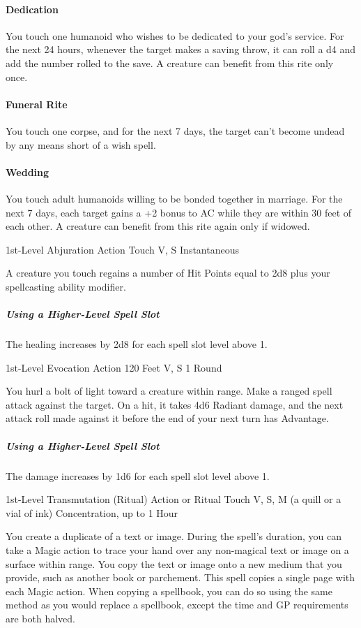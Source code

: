 \documentclass[letterpaper,openany,oneside,twocolumn]{book}
\begin{document}
\paragraph*{Dedication} You touch one humanoid who wishes to be dedicated to your god's service. For the next 24 hours, whenever the target makes a saving throw, it can roll a d4 and add the number rolled to the save. A creature can benefit from this rite only once.

\paragraph*{Funeral Rite} You touch one corpse, and for the next 7 days, the target can't become undead by any means short of a wish spell.

\paragraph*{Wedding} You touch adult humanoids willing to be bonded together in marriage. For the next 7 days, each target gains a +2 bonus to AC while they are within 30 feet of each other. A creature can benefit from this rite again only if widowed.

	{1st-Level Abjuration}
	{Action}
	{Touch}
	{V, S}
	{Instantaneous}

A creature you touch regains a number of Hit Points equal to 2d8 plus your spellcasting ability modifier.

\subparagraph*{Using a Higher-Level Spell Slot} The healing increases by 2d8 for each spell slot level above 1.

	{1st-Level Evocation}
	{Action}
	{120 Feet}
	{V, S}
	{1 Round}

You hurl a bolt of light toward a creature within range. Make a ranged spell attack against the target. On a hit, it takes 4d6 Radiant damage, and the next attack roll made against it before the end of your next turn has Advantage.

\subparagraph*{Using a Higher-Level Spell Slot} The damage increases by 1d6 for each spell slot level above 1.

	{1st-Level Transmutation (Ritual)}
	{Action or Ritual}
	{Touch}
	{V, S, M (a quill or a vial of ink)}
	{Concentration, up to 1 Hour}

You create a duplicate of a text or image. During the spell's duration, you can take a Magic action to trace your hand over any non-magical text or image on a surface within range. You copy the text or image onto a new medium that you provide, such as another book or parchement. This spell copies a single page with each Magic action. When copying a spellbook, you can do so using the same method as you would replace a spellbook, except the time and GP requirements are both halved.
\end{document}
